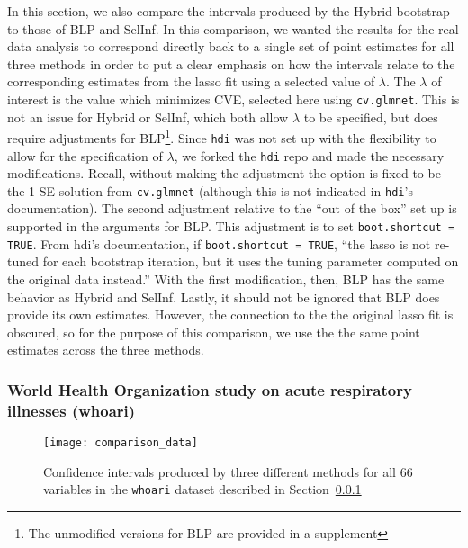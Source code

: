 In this section, we also compare the intervals produced by the Hybrid bootstrap to those of BLP and SelInf. In this comparison, we wanted the results for the real data analysis to correspond directly back to a single set of point estimates for all three methods in order to put a clear emphasis on how the intervals relate to the corresponding estimates from the lasso fit using a selected value of $\lambda$. The $\lambda$ of interest is the value which minimizes CVE, selected here using \texttt{cv.glmnet}. This is not an issue for Hybrid or SelInf, which both allow $\lambda$ to be specified, but does require adjustments for BLP\footnote{The unmodified versions for BLP are provided in a supplement}. Since \texttt{hdi} was not set up with the flexibility to allow for the specification of $\lambda$, we forked the \texttt{hdi} repo and made the necessary modifications. Recall, without making the adjustment the option is fixed to be the 1-SE solution from \texttt{cv.glmnet} (although this is not indicated in \texttt{hdi}'s documentation). The second adjustment relative to the ``out of the box'' set up is supported in the arguments for BLP. This adjustment is to set \texttt{boot.shortcut = TRUE}. From hdi's documentation, if \texttt{boot.shortcut = TRUE}, ``the lasso is not re-tuned for each bootstrap iteration, but it uses the tuning parameter computed on the original data instead.'' With the first modification, then, BLP has the same behavior as Hybrid and SelInf. Lastly, it should not be ignored that BLP does provide its own estimates. However, the connection to the the original lasso fit is obscured, so for the purpose of this comparison, we use the the same point estimates across the three methods.

\subsubsection{World Health Organization study on acute respiratory illnesses (whoari)}\label{Sec:whoari}

\begin{figure}[hbtp]
  \texttt{[image: comparison\_data]}
  \caption{\label{Fig:comparison_data_whoari} Confidence intervals produced by three different methods for all 66 variables in the \texttt{whoari} dataset described in Section~\ref{Sec:whoari}}
\end{figure}

